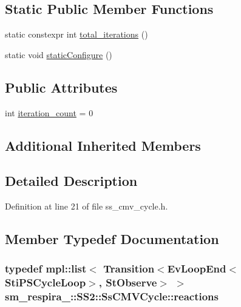 \subsection*{Static Public Member Functions}
\begin{DoxyCompactItemize}
\item 
static constexpr int \hyperlink{structsm__respira__1_1_1SS2_1_1SsCMVCycle_afcff674911a8780139e6da80e1482c1f}{total\+\_\+iterations} ()
\item 
static void \hyperlink{structsm__respira__1_1_1SS2_1_1SsCMVCycle_adad0cf7e5c85e78ea1f28179697ae3ee}{static\+Configure} ()
\end{DoxyCompactItemize}
\subsection*{Public Attributes}
\begin{DoxyCompactItemize}
\item 
int \hyperlink{structsm__respira__1_1_1SS2_1_1SsCMVCycle_af41ac0924309a8e91539577a6b50c1b3}{iteration\+\_\+count} = 0
\end{DoxyCompactItemize}
\subsection*{Additional Inherited Members}


\subsection{Detailed Description}


Definition at line 21 of file ss\+\_\+cmv\+\_\+cycle.\+h.



\subsection{Member Typedef Documentation}
\subsubsection[{\texorpdfstring{reactions}{reactions}}]{\setlength{\rightskip}{0pt plus 5cm}typedef mpl\+::list$<$ Transition$<$Ev\+Loop\+End$<${\bf Sti\+P\+S\+Cycle\+Loop}$>$, {\bf St\+Observe}$>$ $>$ {\bf sm\+\_\+respira\+\_\+::\+S\+S2\+::\+Ss\+C\+M\+V\+Cycle\+::reactions}}\hypertarget{structsm__respira__1_1_1SS2_1_1SsCMVCycle_a95e2f9a21c894a79b29b1179120c3d52}{}\label{structsm__respira__1_1_1SS2_1_1SsCMVCycle_a95e2f9a21c894a79b29b1179120c3d52}


